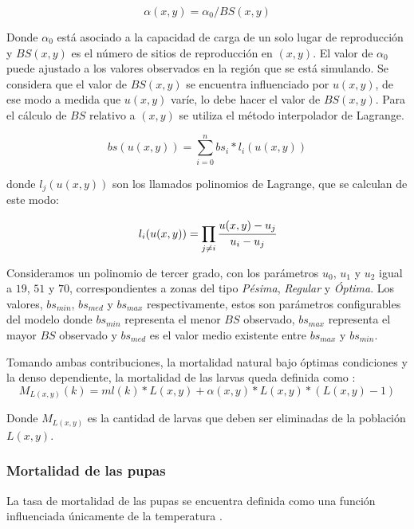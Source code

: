 \begin{equation}
  \alpha (x,y) = \alpha _{0}/BS(x,y)
\end{equation}

Donde $\alpha _{0}$ está asociado a la capacidad de carga de un solo lugar de reproducción y
$BS(x,y)$ es el número de sitios de reproducción en $(x,y)$. El valor de $\alpha _{0}$ puede
ajustado a los valores observados en la región que se está simulando. Se considera que el valor de
$BS(x,y)$ se encuentra influenciado por $u(x,y)$, de ese modo a medida que $u(x,y)$ varíe, lo debe
hacer el valor de $BS(x,y)$. Para el cálculo de $BS$ relativo a $(x,y)$ se utiliza el método
interpolador de Lagrange.

\begin{equation}
\label{eq:sitios-reproduccion-x-y}
    bs(u(x,y)) = \sum_{i=0}^{n} bs_{i} * l_{i}(u(x,y))
\end{equation}

donde $l_j(u(x,y))$ son los llamados polinomios de Lagrange, que se calculan de este modo:

\begin{equation}
\label{eq:sitios-reproduccion-x-y}
    l_{i}(u(x,y)) = \prod_{j \neq i} \cfrac{u(x,y) - u_{j}}{u_{i} - u_{j}}
\end{equation}

Consideramos un polinomio de tercer grado, con los parámetros $u_0$, $u_1$ y $u_2$ igual a $19$,
$51$ y $70$, correspondientes a zonas del tipo \textit{Pésima}, \textit{Regular} y \textit{Óptima}.
Los valores, $bs_{min}$, $bs_{med}$ y $bs_{max}$ respectivamente, estos son parámetros
configurables del modelo donde $bs_{min}$ representa el menor $BS$ observado, $bs_{max}$
representa el mayor $BS$ observado y $bs_{med}$ es el valor medio existente entre $bs_{max}$ y
$bs_{min}$.

Tomando ambas contribuciones, la mortalidad natural bajo óptimas condiciones y la denso
dependiente, la mortalidad de las larvas queda definida como :
\begin{equation}
    M_{L(x,y)}(k) = ml(k) * L(x,y) + \alpha (x,y) * L(x,y) * (L(x,y) - 1)
\end{equation}

Donde $M_{L(x,y)}$ es la cantidad de larvas que deben ser eliminadas de la población $L(x,y)$.

\subsubsection{Mortalidad de las pupas}
La tasa de mortalidad de las pupas se encuentra definida como una función influenciada únicamente
de la temperatura \cite{otero2006stochastic}.

